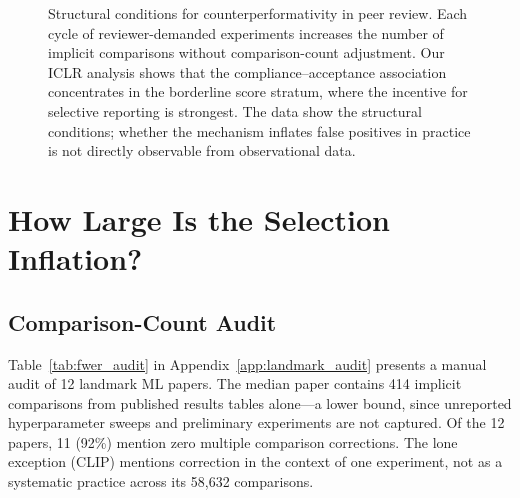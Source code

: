 \documentclass{article}
\begin{document}
\begin{figure}[t]
\centering
{}
\caption{Structural conditions for counterperformativity in peer review. Each cycle of reviewer-demanded experiments increases the number of implicit comparisons without comparison-count adjustment. Our ICLR analysis shows that the compliance--acceptance association concentrates in the borderline score stratum, where the incentive for selective reporting is strongest. The data show the structural conditions; whether the mechanism inflates false positives in practice is not directly observable from observational data.}
\label{fig:loop}
\end{figure}

\section{How Large Is the Selection Inflation?}
\label{sec:inflation}

\subsection{Comparison-Count Audit}

Table~\ref{tab:fwer_audit} in Appendix~\ref{app:landmark_audit} presents a manual audit of 12 landmark ML papers. The median paper contains 414 implicit comparisons from published results tables alone---a lower bound, since unreported hyperparameter sweeps and preliminary experiments are not captured. Of the 12 papers, 11 (92\%) mention zero multiple comparison corrections. The lone exception (CLIP) mentions correction in the context of one experiment, not as a systematic practice across its 58,632 comparisons.
\end{document}
